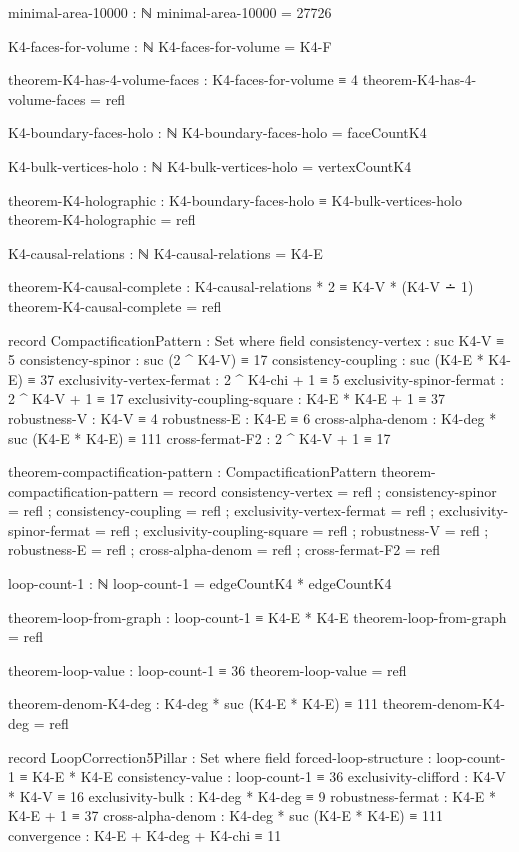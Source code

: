 \documentclass[11pt,a4paper]{book}
\begin{document}
\begin{code}
minimal-area-10000 : ℕ
minimal-area-10000 = 27726

K4-faces-for-volume : ℕ
K4-faces-for-volume = K4-F

theorem-K4-has-4-volume-faces : K4-faces-for-volume ≡ 4
theorem-K4-has-4-volume-faces = refl

K4-boundary-faces-holo : ℕ
K4-boundary-faces-holo = faceCountK4

K4-bulk-vertices-holo : ℕ
K4-bulk-vertices-holo = vertexCountK4

theorem-K4-holographic : K4-boundary-faces-holo ≡ K4-bulk-vertices-holo
theorem-K4-holographic = refl

K4-causal-relations : ℕ
K4-causal-relations = K4-E

theorem-K4-causal-complete : K4-causal-relations * 2 ≡ K4-V * (K4-V ∸ 1)
theorem-K4-causal-complete = refl

record CompactificationPattern : Set where
  field
    consistency-vertex : suc K4-V ≡ 5
    consistency-spinor : suc (2 ^ K4-V) ≡ 17
    consistency-coupling : suc (K4-E * K4-E) ≡ 37
    exclusivity-vertex-fermat : 2 ^ K4-chi + 1 ≡ 5
    exclusivity-spinor-fermat : 2 ^ K4-V + 1 ≡ 17
    exclusivity-coupling-square : K4-E * K4-E + 1 ≡ 37
    robustness-V : K4-V ≡ 4
    robustness-E : K4-E ≡ 6
    cross-alpha-denom : K4-deg * suc (K4-E * K4-E) ≡ 111
    cross-fermat-F2 : 2 ^ K4-V + 1 ≡ 17

theorem-compactification-pattern : CompactificationPattern
theorem-compactification-pattern = record
  { consistency-vertex = refl
  ; consistency-spinor = refl
  ; consistency-coupling = refl
  ; exclusivity-vertex-fermat = refl
  ; exclusivity-spinor-fermat = refl
  ; exclusivity-coupling-square = refl
  ; robustness-V = refl
  ; robustness-E = refl
  ; cross-alpha-denom = refl
  ; cross-fermat-F2 = refl
  }

loop-count-1 : ℕ
loop-count-1 = edgeCountK4 * edgeCountK4

theorem-loop-from-graph : loop-count-1 ≡ K4-E * K4-E
theorem-loop-from-graph = refl

theorem-loop-value : loop-count-1 ≡ 36
theorem-loop-value = refl



theorem-denom-K4-deg : K4-deg * suc (K4-E * K4-E) ≡ 111
theorem-denom-K4-deg = refl


record LoopCorrection5Pillar : Set where
  field
    forced-loop-structure : loop-count-1 ≡ K4-E * K4-E
    consistency-value : loop-count-1 ≡ 36
    exclusivity-clifford : K4-V * K4-V ≡ 16
    exclusivity-bulk : K4-deg * K4-deg ≡ 9
    robustness-fermat : K4-E * K4-E + 1 ≡ 37
    cross-alpha-denom : K4-deg * suc (K4-E * K4-E) ≡ 111
    convergence : K4-E + K4-deg + K4-chi ≡ 11


\end{code}
\end{document}
